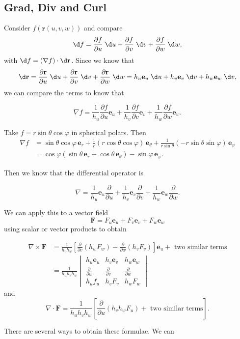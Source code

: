 \documentclass[a4paper]{article}
\begin{document}
\subsection{Grad, Div and Curl}
Consider $f(\mathbf{r}(u, v, w))$ and compare
\[
  \d f = \frac{\partial f}{\partial u}\;\d u + \frac{\partial f}{\partial v}\;\d v + \frac{\partial f}{\partial w}\;\d w,
\]
with $\d f = (\nabla f)\cdot \d \mathbf{r}$. Since we know that
\[
  \d \mathbf{r} = \frac{\partial \mathbf{r}}{\partial u}\;\d u + \frac{\partial \mathbf{r}}{\partial v}\;\d v + \frac{\partial \mathbf{r}}{\partial w}\;\d w = h_u \mathbf{e}_u \;\d u + h_v \mathbf{e}_v \;\d v + h_w \mathbf{e}_w \;\d v,
\]
we can compare the terms to know that
\begin{prop}
  \[
    \nabla f = \frac{1}{h_u} \frac{\partial f}{\partial u} \mathbf{e}_u + \frac{1}{h_v} \frac{\partial f}{\partial v}\mathbf{e}_v + \frac{1}{h_w} \frac{\partial f}{\partial w}\mathbf{e}_w.
  \]
\end{prop}
\begin{eg}
  Take $f = r\sin \theta\cos \varphi$ in spherical polars. Then
  \begin{align*}
    \nabla f &= \sin \theta\cos \varphi\,\mathbf{e}_r + \frac{1}{r}(r\cos \theta\cos \varphi)\,\mathbf{e}_\theta + \frac{1}{r\sin \theta}(-r\sin \theta\sin \varphi)\,\mathbf{e}_\varphi\\
    &= \cos\varphi(\sin \theta \,\mathbf{e}_r + \cos \theta \,\mathbf{e}_\theta) - \sin \varphi \,\mathbf{e}_\varphi.
  \end{align*}
\end{eg}

Then we know that the differential operator is
\begin{prop}
  \[
    \nabla = \frac{1}{h_u}\mathbf{e}_u \frac{\partial }{\partial u} + \frac{1}{h_v}\mathbf{e}_v\frac{\partial }{\partial v} + \frac{1}{h_w}\mathbf{e}_w \frac{\partial}{\partial w}.
  \]
\end{prop}
We can apply this to a vector field
\[
  \mathbf{F} = F_u \mathbf{e}_u + F_v \mathbf{e}_v + F_w \mathbf{e}_w
\]
using scalar or vector products to obtain
\begin{prop}
  \begin{align*}
    \nabla \times \mathbf{F} &= \frac{1}{h_vh_w}\left[\frac{\partial}{\partial v}(h_wF_w) - \frac{\partial }{\partial w}(h_vF_v)\right]\mathbf{e}_u + \text{ two similar terms}\\
    &= \frac{1}{h_uh_vh_w}
    \begin{vmatrix} h_u\mathbf{e}_u & h_v\mathbf{e}_v & h_w \mathbf{e}_w\\
      \frac{\partial}{\partial u} & \frac{\partial}{\partial v} & \frac{\partial}{\partial w}\\
      h_u f_u & h_v F_v & h_wF_w
    \end{vmatrix}
  \end{align*}
  and
  \[
    \nabla\cdot \mathbf{F} = \frac{1}{h_uh_vh_w}\left[\frac{\partial}{\partial u}(h_vh_wF_u) + \text{ two similar terms}\right].
  \]
\end{prop}
There are several ways to obtain these formulae. We can
\end{document}
